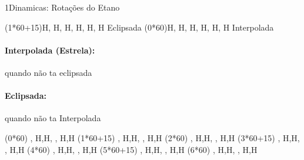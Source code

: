 \documentclass[\mainfilename]{subfiles}
\begin{document}
\begin{sectionBox}1{Dinamicas: Rotações do Etano} %
    
    \begin{center}
        \newman[
            atoms={fill=red\Dark, inner sep=2mm, rounded corners},
            back-atoms={fill=blue\Dark, inner sep=2mm, rounded corners}
        ](1*60+15){H, H, H, H, H, H}
        Eclipsada
        \qquad
        \newman[
            atoms={fill=red\Dark, inner sep=2mm, rounded corners},
            back-atoms={fill=blue\Dark, inner sep=2mm, rounded corners}
        ](0*60){H, H, H, H, H, H}
        Interpolada
    \end{center}

    \paragraph*{Interpolada (Estrela):} quando não ta eclipsada
    \paragraph*{Eclipsada:} quando não ta Interpolada

    \begin{center}
        \newman(0*60){\hspace*{3mm} 
            {\color{red\Light}},  H,H,
            {\color{blue\Light}}, H,H
        }
        \newman(1*60+15){\hspace*{3mm} 
            {\color{red\Light}},  H,H,
            {\color{blue\Light}}, H,H
        }
        \newman(2*60){\hspace*{3mm} 
            {\color{red\Light}},  H,H,
            {\color{blue\Light}}, H,H
        }
        \newman(3*60+15){\hspace*{3mm} 
            {\color{red\Light}},  H,H,
            {\color{blue\Light}}, H,H
        }
        \newman(4*60){\hspace*{3mm} 
            {\color{red\Light}},  H,H,
            {\color{blue\Light}}, H,H
        }
        \newman(5*60+15){\hspace*{3mm} 
            {\color{red\Light}},  H,H,
            {\color{blue\Light}}, H,H
        }
        \newman(6*60){\hspace*{3mm} 
            {\color{red\Light}},  H,H,
            {\color{blue\Light}}, H,H
        }
    \end{center}
    
\end{sectionBox}
\end{document}
